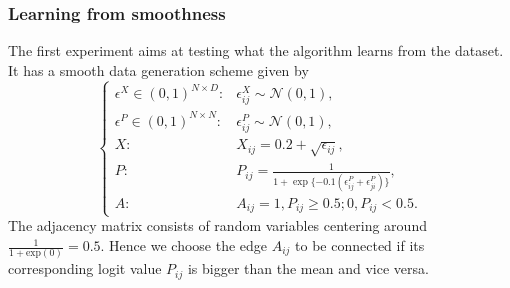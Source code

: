 \subsubsection{Learning from smoothness}
The first experiment aims at testing what the algorithm learns from the dataset. 
It has a smooth data generation scheme given by 
\begin{equation}
    \label{eq: sec3_generator1}
    \left\{\begin{aligned}
        \epsilon^X\in(0,1)^{N\times D}:& \epsilon^X_{ij}\sim\mathcal{N}(0,1), \\
        \epsilon^P\in(0,1)^{N\times N}:& \epsilon^P_{ij}\sim\mathcal{N}(0,1), \\
        X: & X_{ij} = 0.2 + \sqrt{\epsilon_{ij}}, \\
        P: & P_{ij} = \frac{1}{1+\exp\{-0.1(\epsilon^P_{ij}+\epsilon^P_{ji})\}}, \\
        A: & A_{ij} = 1, P_{ij}\geq0.5; 0, P_{ij}<0.5.
    \end{aligned}\right.
\end{equation}
The adjacency matrix consists of random variables centering around $\frac{1}{1+\mathrm{exp}(0)}= 0.5$. 
Hence we choose the edge $A_{ij}$ to be connected if its corresponding logit value $P_{ij}$ is bigger than the mean and vice versa. 


